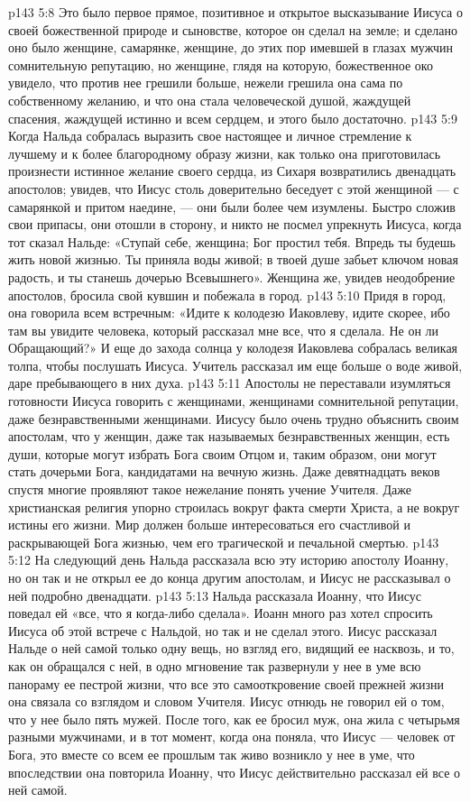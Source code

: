 \vs p143 5:8 Это было первое прямое, позитивное и открытое высказывание Иисуса о своей божественной природе и сыновстве, которое он сделал на земле; и сделано оно было женщине, самарянке, женщине, до этих пор имевшей в глазах мужчин сомнительную репутацию, но женщине, глядя на которую, божественное око увидело, что против нее грешили больше, нежели грешила она сама по собственному желанию, и что  она стала человеческой душой, жаждущей спасения, жаждущей истинно и всем сердцем, и этого было достаточно.
\vs p143 5:9 Когда Нальда собралась выразить свое настоящее и личное стремление к лучшему и к более благородному образу жизни, как только она приготовилась произнести истинное желание своего сердца, из Сихаря возвратились двенадцать апостолов; увидев, что Иисус столь доверительно беседует с этой женщиной --- с самарянкой и притом наедине, --- они были более чем изумлены. Быстро сложив свои припасы, они отошли в сторону, и никто не посмел упрекнуть Иисуса, когда тот сказал Нальде: «Ступай себе, женщина; Бог простил тебя. Впредь ты будешь жить новой жизнью. Ты приняла воды живой; в твоей душе забьет ключом новая радость, и ты станешь дочерью Всевышнего». Женщина же, увидев неодобрение апостолов, бросила свой кувшин и побежала в город.
\vs p143 5:10 Придя в город, она говорила всем встречным: «Идите к колодезю Иаковлеву, идите скорее, ибо там вы увидите человека, который рассказал мне все, что я сделала. Не он ли Обращающий?» И еще до захода солнца у колодезя Иаковлева собралась великая толпа, чтобы послушать Иисуса. Учитель рассказал им еще больше о воде живой, даре пребывающего в них духа.
\vs p143 5:11 Апостолы не переставали изумляться готовности Иисуса говорить с женщинами, женщинами сомнительной репутации, даже безнравственными женщинами. Иисусу было очень трудно объяснить своим апостолам, что у женщин, даже так называемых безнравственных женщин, есть души, которые могут избрать Бога своим Отцом и, таким образом, они могут стать дочерьми Бога, кандидатами на вечную жизнь. Даже девятнадцать веков спустя многие проявляют такое нежелание понять учение Учителя. Даже христианская религия упорно строилась вокруг факта смерти Христа, а не вокруг истины его жизни. Мир должен больше интересоваться его счастливой и раскрывающей Бога жизнью, чем его трагической и печальной смертью.
\vs p143 5:12 На следующий день Нальда рассказала всю эту историю апостолу Иоанну, но он так и не открыл ее до конца другим апостолам, и Иисус не рассказывал о ней подробно двенадцати.
\vs p143 5:13 Нальда рассказала Иоанну, что Иисус поведал ей «все, что я когда\hyp{}либо сделала». Иоанн много раз хотел спросить Иисуса об этой встрече с Нальдой, но так и не сделал этого. Иисус рассказал Нальде о ней самой только одну вещь, но взгляд его, видящий ее насквозь, и то, как он обращался с ней, в одно мгновение так развернули у нее в уме всю панораму ее пестрой жизни, что все это самооткровение своей прежней жизни она связала со взглядом и словом Учителя. Иисус отнюдь не говорил ей о том, что у нее было пять мужей. После того, как ее бросил муж, она жила с четырьмя разными мужчинами, и в тот момент, когда она поняла, что Иисус --- человек от Бога, это вместе со всем ее прошлым так живо возникло у нее в уме, что впоследствии она повторила Иоанну, что Иисус действительно рассказал ей все о ней самой.
